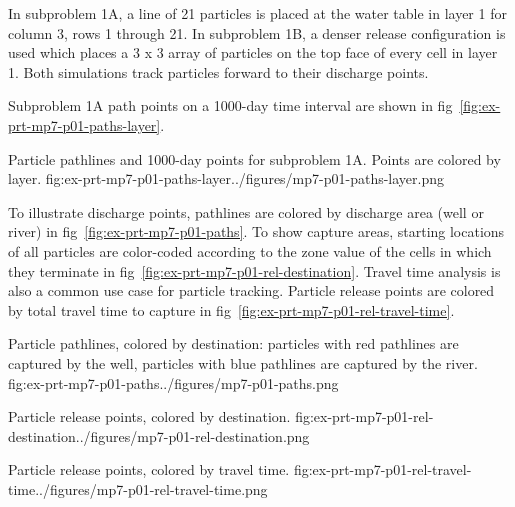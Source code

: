 In subproblem 1A, a line of 21 particles is placed at the water table in layer 1 for column 3, rows 1 through 21. In subproblem 1B, a denser release configuration is used which places a 3 x 3 array of particles on the top face of every cell in layer 1. Both simulations track particles forward to their discharge points.

Subproblem 1A path points on a 1000-day time interval are shown in fig~\ref{fig:ex-prt-mp7-p01-paths-layer}.

\begin{StandardFigure}{
    Particle pathlines and 1000-day points for subproblem 1A. Points are colored by layer.
    }{fig:ex-prt-mp7-p01-paths-layer}{../figures/mp7-p01-paths-layer.png}
\end{StandardFigure}

To illustrate discharge points, pathlines are colored by discharge area (well or river) in fig~\ref{fig:ex-prt-mp7-p01-paths}. To show capture areas, starting locations of all particles are color-coded according to the zone value of the cells in which they terminate in fig~\ref{fig:ex-prt-mp7-p01-rel-destination}. Travel time analysis is also a common use case for particle tracking. Particle release points are colored by total travel time to capture in fig~\ref{fig:ex-prt-mp7-p01-rel-travel-time}.

\begin{StandardFigure}{
    Particle pathlines, colored by destination: particles with red pathlines are captured by the well, particles with blue pathlines are captured by the river.
    }{fig:ex-prt-mp7-p01-paths}{../figures/mp7-p01-paths.png}
\end{StandardFigure}

\begin{StandardFigure}{
    Particle release points, colored by destination.
    }{fig:ex-prt-mp7-p01-rel-destination}{../figures/mp7-p01-rel-destination.png}
\end{StandardFigure}

\begin{StandardFigure}{
    Particle release points, colored by travel time.
    }{fig:ex-prt-mp7-p01-rel-travel-time}{../figures/mp7-p01-rel-travel-time.png}
\end{StandardFigure}